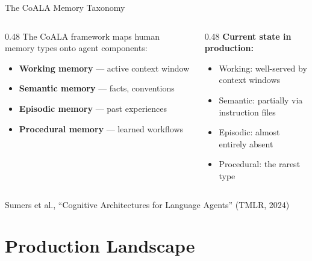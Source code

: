 \documentclass[aspectratio=169]{beamer}
\begin{document}
\begin{frame}{The CoALA Memory Taxonomy}
  \begin{columns}[T]
    \begin{column}{0.48\textwidth}
      The CoALA framework maps human memory types onto agent components:

      \vspace{0.3cm}

      \begin{itemize}
        \item \textbf{Working memory} --- active context window
        \item \textbf{Semantic memory} --- facts, conventions
        \item \textbf{Episodic memory} --- past experiences
        \item \textbf{Procedural memory} --- learned workflows
      \end{itemize}
    \end{column}

    \begin{column}{0.48\textwidth}
      \textbf{Current state in production:}

      \vspace{0.3cm}

      \begin{itemize}
        \item[\textcolor{green!60!black}{$\checkmark$}] Working: well-served by context windows
        \item[\textcolor{orange}{$\sim$}] Semantic: partially via instruction files
        \item[\textcolor{red}{$\times$}] \alert{Episodic: almost entirely absent}
        \item[\textcolor{red}{$\times$}] \alert{Procedural: the rarest type}
      \end{itemize}
    \end{column}
  \end{columns}

  \vspace{0.3cm}

  {\footnotesize Sumers et al., ``Cognitive Architectures for Language Agents'' (TMLR, 2024)}
\end{frame}

\section{Production Landscape}
\end{document}
